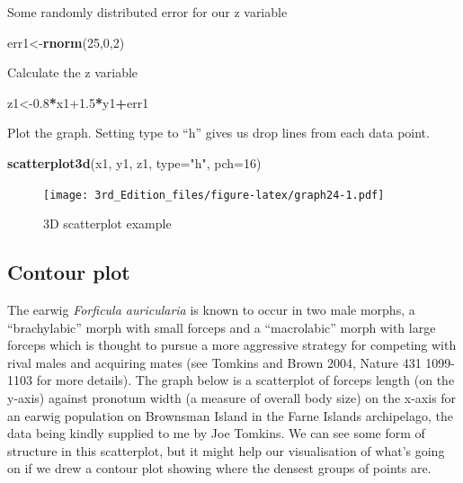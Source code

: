 \documentclass[
]{book}
\newenvironment{Shaded}{\begin{snugshade}}{\end{snugshade}}
\newcommand{\DataTypeTok}[1]{\textcolor[rgb]{0.13,0.29,0.53}{#1}}
\newcommand{\DecValTok}[1]{\textcolor[rgb]{0.00,0.00,0.81}{#1}}
\newcommand{\FloatTok}[1]{\textcolor[rgb]{0.00,0.00,0.81}{#1}}
\newcommand{\KeywordTok}[1]{\textcolor[rgb]{0.13,0.29,0.53}{\textbf{#1}}}
\newcommand{\NormalTok}[1]{#1}
\newcommand{\OperatorTok}[1]{\textcolor[rgb]{0.81,0.36,0.00}{\textbf{#1}}}
\newcommand{\StringTok}[1]{\textcolor[rgb]{0.31,0.60,0.02}{#1}}
\begin{document}
Some randomly distributed error for our z variable

\begin{Shaded}
\begin{Highlighting}[]
\NormalTok{err1<-}\KeywordTok{rnorm}\NormalTok{(}\DecValTok{25}\NormalTok{,}\DecValTok{0}\NormalTok{,}\DecValTok{2}\NormalTok{)         }
\end{Highlighting}
\end{Shaded}

Calculate the z variable

\begin{Shaded}
\begin{Highlighting}[]
\NormalTok{z1<-}\FloatTok{0.8}\OperatorTok{*}\NormalTok{x1}\FloatTok{+1.5}\OperatorTok{*}\NormalTok{y1}\OperatorTok{+}\NormalTok{err1      }
\end{Highlighting}
\end{Shaded}

Plot the graph. Setting type to ``h'' gives us drop lines from each data point.

\begin{Shaded}
\begin{Highlighting}[]
\KeywordTok{scatterplot3d}\NormalTok{(x1, y1, z1, }\DataTypeTok{type=}\StringTok{"h"}\NormalTok{, }\DataTypeTok{pch=}\DecValTok{16}\NormalTok{) }
\end{Highlighting}
\end{Shaded}

\begin{figure}
\centering
\texttt{[image: 3rd\_Edition\_files/figure-latex/graph24-1.pdf]}
\caption{\label{fig:graph24}3D scatterplot example}
\end{figure}

\hypertarget{contour-plot}{%
\subsection{Contour plot}\label{contour-plot}}

The earwig \emph{Forficula auricularia} is known to occur in two male morphs, a ``brachylabic'' morph with small forceps and a ``macrolabic'' morph with large forceps which is thought to pursue a more aggressive strategy for competing with rival males and acquiring mates (see Tomkins and Brown 2004, Nature 431 1099-1103 for more details). The graph below is a scatterplot of forceps length (on the y-axis) against pronotum width (a measure of overall body size) on the x-axis for an earwig population on Brownsman Island in the Farne Islands archipelago, the data being kindly supplied to me by Joe Tomkins. We can see some form of structure in this scatterplot, but it might help our visualisation of what's going on if we drew a contour plot showing where the densest groups of points are.
\end{document}

